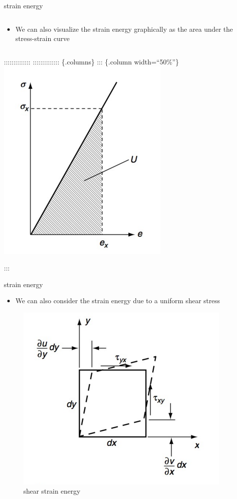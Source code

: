 \documentclass[
  letterpaper,
  ignorenonframetext,
  aspectratio=43,
  handout,
  12pt]{beamer}
\providecommand{\tightlist}{%
  \setlength{\itemsep}{0pt}\setlength{\parskip}{0pt}}
\providecommand{\tightlist}{%
\setlength{\itemsep}{0pt}\setlength{\parskip}{0pt}}
\let\Oldincludegraphics\includegraphics
\renewcommand{\includegraphics}[2][]{\Oldincludegraphics[width=\textwidth,height=0.7\textheight,keepaspectratio]{#2}}
\begin{document}
\begin{frame}{strain energy}
\protect\hypertarget{strain-energy-6}{}
\begin{column}{0.5\textwidth}
\begin{itemize}
\tightlist
\item
  We can also visualize the strain energy graphically as the area under
  the stress-strain curve
\end{itemize}
\end{column}

:::::::::::::: :::::::::::::: \{.columns\} ::: \{.column
width=``50\%''\}\\
\includegraphics{../images/strain_energy.PNG}

:::
\end{frame}

\begin{frame}{strain energy}
\protect\hypertarget{strain-energy-7}{}
\begin{itemize}
\tightlist
\item
  We can also consider the strain energy due to a uniform shear stress
\end{itemize}

\begin{figure}
\centering
\includegraphics{../images/shear.PNG}
\caption{shear strain energy}
\end{figure}
\end{frame}
\end{document}
